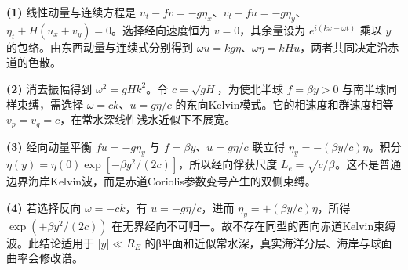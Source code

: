 \par\noindent\textbf{(1)} 线性动量与连续方程是 \(u_t-fv=-g\eta_x\)、\(v_t+fu=-g\eta_y\)、\(\eta_t+H(u_x+v_y)=0\)。选择经向速度恒为 \(v=0\)，其余量设为 \(e^{i(kx-\omega t)}\) 乘以 \(y\) 的包络。由东西动量与连续式分别得到 \(\omega u=kg\eta\)、\(\omega\eta=kHu\)，两者共同决定沿赤道的色散。
\par\noindent\textbf{(2)} 消去振幅得到 \(\omega^2=gHk^2\)。令 \(c=\sqrt{gH}\)，为使北半球 \(f=\beta y>0\) 与南半球同样束缚，需选择 \(\omega=ck\)、\(u=g\eta/c\) 的东向Kelvin模式。它的相速度和群速度相等 \(v_p=v_g=c\)，在常水深线性浅水近似下不展宽。
\par\noindent\textbf{(3)} 经向动量平衡 \(fu=-g\eta_y\) 与 \(f=\beta y\)、\(u=g\eta/c\) 联立得 \(\eta_y=-(\beta y/c)\eta\)。积分 \(\eta(y)=\eta(0)\exp[-\beta y^2/(2c)]\)，所以经向俘获尺度 \(L_e=\sqrt{c/\beta}\)。这不是普通边界海岸Kelvin波，而是赤道Coriolis参数变号产生的双侧束缚。
\par\noindent\textbf{(4)} 若选择反向 \(\omega=-ck\)，有 \(u=-g\eta/c\)，进而 \(\eta_y=+(\beta y/c)\eta\)，所得 \(\exp(+\beta y^2/(2c))\) 在无界经向不可归一。故不存在同型的西向赤道Kelvin束缚波。此结论适用于 \(|y|\ll R_E\) 的β平面和近似常水深，真实海洋分层、海岸与球面曲率会修改谱。
